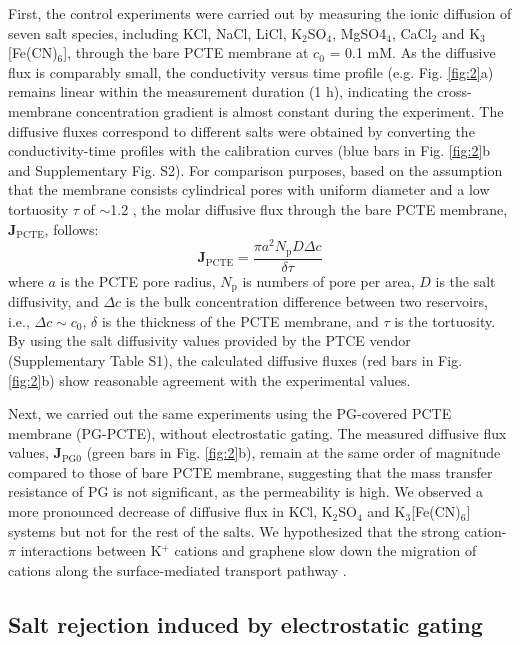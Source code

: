 \documentclass[journal=langd5,email=true, hyperref=true, keywords=false]{achemso}
\newcommand{\Fig}{Fig.}
\begin{document}
First, the control experiments were carried out by measuring the ionic
diffusion of seven salt species, including KCl, NaCl, LiCl,
K$_{2}$SO$_{4}$, MgSO4$_{4}$, CaCl$_{2}$ and K$_{3}$[Fe(CN)$_{6}$],
through the bare PCTE membrane at $c_{0}$ = 0.1 mM. As the diffusive
flux is comparably small, the conductivity versus time profile
(e.g. \Fig{} \ref{fig:2}a) remains linear within the measurement
duration (1 h), indicating the cross-membrane concentration gradient
is almost constant during the experiment. The diffusive fluxes
correspond to different salts were obtained by converting the
conductivity-time profiles with the calibration curves (blue bars in
\Fig{} \ref{fig:2}b and Supplementary \Fig{} S2). For comparison
purposes, based on the assumption that the membrane consists
cylindrical pores with uniform diameter and a low tortuosity $\tau$ of
$\sim{}$1.2 \cite{O_Hern_2012}, the molar diffusive flux through the
bare PCTE membrane, $\boldsymbol{J}_{\mathrm{PCTE}}$, follows:
  \begin{equation}
    \label{eq:j-pcte}
    \boldsymbol{J}_{\mathrm{PCTE}} = \frac{\pi a^{2} N_{\mathrm{p}} D \Delta c}{\delta \tau}
  \end{equation}
where $a$ is the PCTE pore radius, $N_{\mathrm{p}}$ is numbers of pore
per area, $D$ is the salt diffusivity, and $\Delta c$ is the bulk
concentration difference between two reservoirs, i.e.,
$\Delta c \sim c_{0}$, $\delta$ is the thickness of the PCTE membrane,
and $\tau$ is the tortuosity. By using the salt diffusivity values
provided by the PTCE vendor (Supplementary Table S1), the
calculated diffusive fluxes (red bars in \Fig{} \ref{fig:2}b) show
reasonable agreement with the experimental values.

Next, we carried out the same experiments using the PG-covered PCTE
membrane (PG-PCTE), without electrostatic gating. The measured
diffusive flux values, $\boldsymbol{J}_{\mathrm{PG0}}$ (green bars in
\Fig{} \ref{fig:2}b), remain at the same order of magnitude compared
to those of bare PCTE membrane, suggesting that the mass transfer
resistance of PG is not significant, as the permeability is high. We
observed a more pronounced decrease of diffusive flux in KCl,
K$_{2}$SO$_{4}$ and K$_{3}$[Fe(CN)$_{6}$] systems but not for the rest
of the salts. We hypothesized that the strong cation-$\pi$ interactions
between K$^{+}$ cations and graphene slow down the migration of cations
along the surface-mediated transport pathway \cite{Sun_2014}.

\subsection{Salt rejection induced by electrostatic gating}
\label{sec:res-2}
\end{document}
